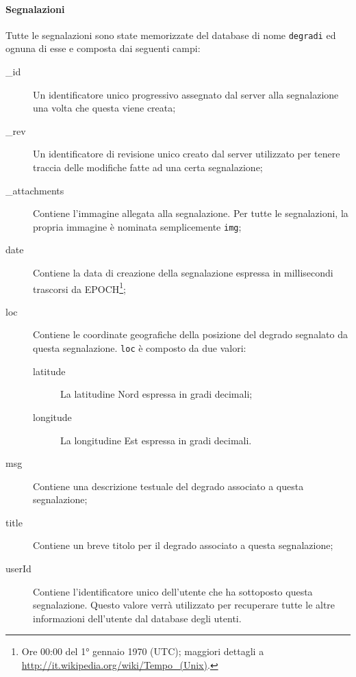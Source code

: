                 \paragraph{Segnalazioni}
                Tutte le segnalazioni sono state memorizzate del database di
                nome \texttt{degradi} ed ognuna di esse e composta dai seguenti
                campi:
                \begin{description}
                    \item[\_id] Un identificatore unico progressivo assegnato
                    dal server alla segnalazione una volta che questa viene
                    creata;
                    \item[\_rev] Un identificatore di revisione unico creato
                    dal server utilizzato per tenere traccia delle modifiche
                    fatte ad una certa segnalazione;
                    \item[\_attachments] Contiene l'immagine allegata alla
                    segnalazione. Per tutte le segnalazioni, la propria
                    immagine è nominata semplicemente \texttt{img};
                    \item[date] Contiene la data di creazione della
                    segnalazione espressa in millisecondi trascorsi da
                    EPOCH\footnote{Ore 00:00 del 1° gennaio 1970 (UTC);
                    maggiori dettagli a
                    \url{http://it.wikipedia.org/wiki/Tempo_(Unix)}.};
                    \item[loc] Contiene le coordinate geografiche della
                    posizione del degrado segnalato da questa segnalazione.
                    \texttt{loc} è composto da due valori:
                    \begin{description}
                        \item[latitude] La latitudine Nord espressa in gradi
                        decimali;
                        \item[longitude] La longitudine Est espressa in gradi
                        decimali.
                    \end{description}
                    \item[msg] Contiene una descrizione testuale del degrado
                    associato a questa segnalazione;
                    \item[title] Contiene un breve titolo per il degrado
                    associato a questa segnalazione;
                    \item[userId] Contiene l'identificatore unico dell'utente
                    che ha sottoposto questa segnalazione. Questo valore verrà
                    utilizzato per recuperare tutte le altre informazioni
                    dell'utente dal database degli utenti.
                \end{description}

